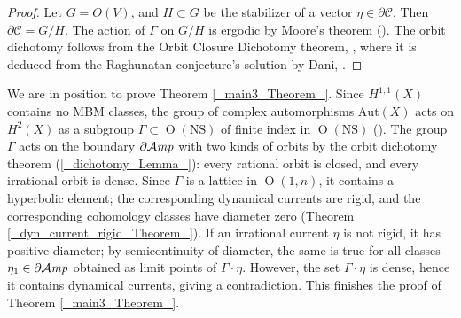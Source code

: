 \documentclass[11pt]{article}
\newcommand{\6}{\partial}
\newcommand{\Z}{\mathbb{Z}}
\newcommand{\CC}{\mathcal{C}}
\newcommand{\rmO}{\operatorname{O}}
\newcommand{\NS}{\mathrm{NS}}
\newcommand{\Aut}{\mathrm{Aut}}
\newcommand{\Amp}{{\mathcal{A}\it {mp}}}
\begin{document}
\begin{proof}
Let  $G=O(V)$, and $H\subset G$ be the stabilizer of
a vector $\eta\in \6\CC$. Then 
$\6\CC= G/H$. The action of $\Gamma$ on $G/H$ is
ergodic by Moore's theorem 
(\cite{_Morris:Ratner_}). The orbit dichotomy
follows from the Orbit Closure Dichotomy theorem, 
\cite[Theorem 7.4.2]{_Filip_Tosatti:canonical_},
where it is deduced from
the Raghunatan conjecture's solution
by Dani, \cite[Theorem A]{_Dani:Horospherical_}.
\end{proof}


We are in position to prove Theorem \ref{_main3_Theorem_}.
Since $H^{1,1}(X)$
contains no MBM classes, the group of complex
automorphisms $\Aut(X)$ acts on $H^2(X)$ as a
subgroup $\Gamma \subset \rmO(\NS)$ of finite index in $\rmO(\NS)$
(\cite{AV2}).
The group $\Gamma$ acts on the boundary $\6\Amp$
with two kinds of orbits by the orbit dichotomy theorem
(\ref{_dichotomy_Lemma_}): every rational orbit is closed,
and every irrational orbit is dense. Since $\Gamma$ is a
lattice in $\rmO(1,n)$, it contains a hyperbolic element;
the corresponding dynamical currents are rigid, and 
the corresponding cohomology classes have diameter zero 
(Theorem \ref{_dyn_current_rigid_Theorem_}). If an irrational
current $\eta$ is not rigid, it has positive diameter;
by semicontinuity of diameter, the same is true
for all classes $\eta_1\in \6\Amp$
obtained as limit points of $\Gamma \cdot \eta$.
However, the set $\Gamma \cdot \eta$ is dense,
hence it contains dynamical currents, giving
a contradiction. This finishes the proof of Theorem 
\ref{_main3_Theorem_}.


\bigskip
\end{document}
